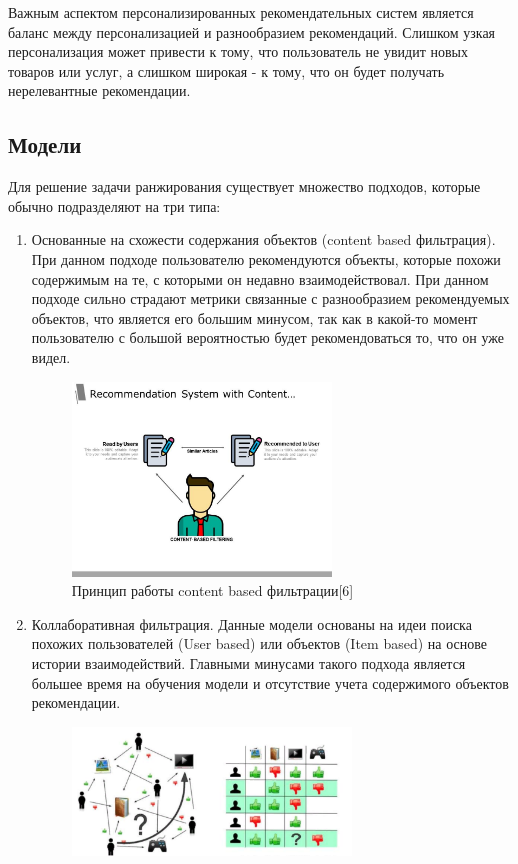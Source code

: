 \documentclass[bachelor, och, coursework]{SCWorks}
\begin{document}
Важным аспектом персонализированных рекомендательных систем является баланс между персонализацией и разнообразием рекомендаций.
Слишком узкая персонализация может привести к тому, что пользователь не увидит новых товаров или услуг, а слишком широкая - к тому,
что он будет получать нерелевантные рекомендации.
\subsection{Модели}
Для решение задачи ранжирования существует множество подходов, которые обычно подразделяют на три типа:

\begin{enumerate}
    \item Основанные на схожести содержания объектов (content based фильтрация). При данном подходе пользователю рекомендуются
    объекты, которые похожи содержимым на те, с которыми он недавно взаимодействовал. При данном подходе сильно страдают
    метрики связанные с разнообразием рекомендуемых объектов, что является его большим минусом, так как в какой-то
    момент пользователю с большой вероятностью будет рекомендоваться то, что он уже видел.
    \begin{figure}[H]
        \centering
        \includegraphics[width=0.65\textwidth]{pic/2}
        \caption{Принцип работы content based фильтрации[6]}
        \label{fig:img1}
    \end{figure}
    \item Коллаборативная фильтрация. Данные модели основаны на идеи поиска похожих пользователей (User based) или объектов (Item based)
    на основе истории взаимодействий. Главными минусами такого подхода является большее время на обучения модели и отсутствие учета содержимого объектов рекомендации.
    \begin{figure}[H]
        \centering
        \includegraphics[width=0.7\textwidth]{pic/1}

\end{figure}
\end{enumerate}
\end{document}
